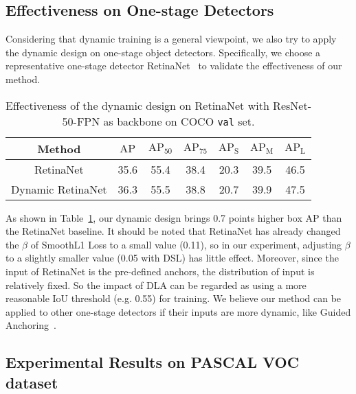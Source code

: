 \documentclass[runningheads]{llncs}
\begin{document}
\subsection{Effectiveness on One-stage Detectors}

Considering that dynamic training is a general viewpoint, we also try to apply the dynamic design on one-stage object detectors. Specifically, we choose a representative one-stage detector RetinaNet~\cite{FocalLoss} to validate the effectiveness of our method. 


\begin{table}[!h]
    \caption{Effectiveness of the dynamic design on RetinaNet with ResNet-50-FPN as backbone on COCO \texttt{val} set.}
    \label{tab:sup_retinanet}
    \begin{center}
\setlength{\tabcolsep}{4pt}
\begin{tabular}{ccccccc}
\toprule
Method & $\mathrm{AP}$ & $\mathrm{AP}_{50}$ & $\mathrm{AP}_{75}$ & $\mathrm{AP_S}$ & $\mathrm{AP_M}$ & $\mathrm{AP_L}$\\
\midrule
RetinaNet & 35.6 & 55.4 & 38.4 & 20.3 & 39.5 & 46.5\\
Dynamic RetinaNet & 36.3 & 55.5 & 38.8 & 20.7 & 39.9 & 47.5\\
\bottomrule
\end{tabular}
\end{center}
 \end{table}

As shown in Table~\ref{tab:sup_retinanet}, our dynamic design brings 0.7 points higher box AP than the RetinaNet baseline. It should be noted that RetinaNet has already changed the $\beta$ of SmoothL1 Loss to a small value (0.11), so in our experiment, adjusting $\beta$ to a slightly smaller value (0.05 with DSL) has little effect. Moreover, since the input of RetinaNet is the pre-defined anchors, the distribution of input is relatively fixed. So the impact of DLA can be regarded as using a more reasonable IoU threshold (e.g. 0.55) for training. We believe our method can be applied to other one-stage detectors if their inputs are more dynamic, like Guided Anchoring~\cite{GuidedAnchor}.


\subsection{Experimental Results on PASCAL VOC dataset}
\end{document}

